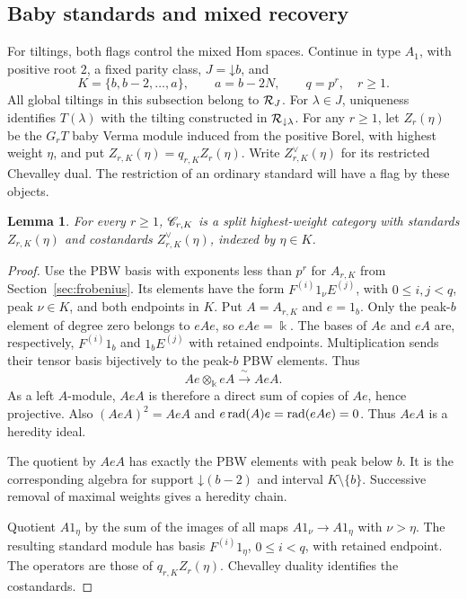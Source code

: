 \documentclass[11pt,reqno]{amsart}
\newcommand{\kk}{\Bbbk}\newcommand{\ZZ}{\mathbb Z}\newcommand{\NN}{\mathbb N}
\newtheorem{lemma}[theorem]{Lemma}
\theoremstyle{definition}
\theoremstyle{remark}
\numberwithin{equation}{section}
\begin{document}
\subsection{Baby standards and mixed recovery}
For tiltings, both flags control the mixed Hom spaces. Continue in
type $A_1$, with positive root $2$, a fixed parity class,
$J=\mathord\downarrow b$, and
\[
 K=\{b,b-2,\ldots,a\},\qquad a=b-2N,\qquad q=p^r,\quad r\geq1.
\]
All global tiltings in this subsection belong to $\mathcal R_J$.
For $\lambda\in J$, uniqueness identifies $T(\lambda)$ with the
tilting constructed in $\mathcal R_{\mathord\downarrow\lambda}$.
For any $r\geq1$, let $Z_r(\eta)$
be the $G_rT$ baby Verma module induced from the positive
Borel, with highest weight $\eta$, and put
$Z_{r,K}(\eta)=q_{r,K}Z_r(\eta)$.
Write $Z^\vee_{r,K}(\eta)$ for its restricted Chevalley dual.
The restriction of an ordinary standard will have a flag by these objects.

\begin{lemma}\label{lem:baby-hw}
For every $r\geq1$, $\mathscr C_{r,K}$ is a split highest-weight category
with standards $Z_{r,K}(\eta)$ and costandards
$Z^\vee_{r,K}(\eta)$, indexed by $\eta\in K$.
\end{lemma}
\begin{proof}
Use the PBW basis with exponents less than $p^r$ for $A_{r,K}$ from
Section~\ref{sec:frobenius}. Its elements have the form
$F^{(i)}1_\nu E^{(j)}$, with $0\leq i,j<q$, peak $\nu\in K$, and
both endpoints in $K$. Put $A=A_{r,K}$ and $e=1_b$. Only the
peak-$b$ element of degree zero belongs to $eAe$, so $eAe=\kk$.
The bases of $Ae$ and $eA$ are, respectively,
$F^{(i)}1_b$ and $1_bE^{(j)}$ with retained endpoints.
Multiplication sends their tensor basis bijectively to the peak-$b$
PBW elements. Thus
\[
 Ae\otimes_{\kk}eA\xrightarrow{\ \sim\ }AeA.
\]
As a left $A$-module, $AeA$ is therefore a direct sum of copies of
$Ae$, hence projective. Also $(AeA)^2=AeA$ and
$e\operatorname{rad}(A)e=\operatorname{rad}(eAe)=0$. Thus $AeA$ is a heredity ideal.

The quotient by $AeA$ has exactly the PBW elements with peak below $b$.
It is the corresponding algebra for support $\mathord\downarrow(b-2)$
and interval $K\setminus\{b\}$. Successive removal of maximal weights gives a
heredity chain.

Quotient $A1_\eta$ by the sum of the images of all maps
$A1_\nu\to A1_\eta$ with $\nu>\eta$. The resulting standard module
has basis $F^{(i)}1_\eta$, $0\leq i<q$, with retained endpoint.
The operators are those of $q_{r,K}Z_r(\eta)$. Chevalley duality
identifies the costandards.
\end{proof}
\end{document}
